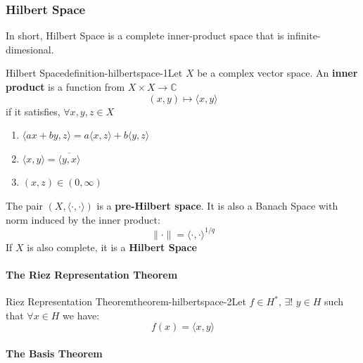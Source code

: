 \subsubsection{Hilbert Space}

In short, Hilbert Space is a complete inner-product space that is infinite-dimesional.

\begin{mystthmdefinition}{Hilbert Space}{definition-hilbertspace-1}Let $X$ be a complex vector space. An \textbf{inner product} is a function from $X \times X \to \mathbb{C}$
\begin{equation}
(x,y)\mapsto \langle x,y \rangle
\end{equation}
if it satisfies, $\forall x,y, z \in X$

\begin{enumerate}
\item $\langle ax+by, z\rangle=a\langle x,z \rangle + b\langle y, z\rangle$
\item $\langle x,y \rangle = \overline{\langle y, x\rangle}$
\item $(x,z)\in (0,\infty)$
\end{enumerate}

The pair $(X,\langle \cdot, \cdot\rangle)$ is a \textbf{pre-Hilbert space}. It is also a Banach Space with norm induced by the inner product:
\begin{equation}
\|\cdot \| = \langle\cdot, \cdot \rangle^{1/q}
\end{equation}
If $X$ is also complete, it is a \textbf{Hilbert Space}

\end{mystthmdefinition}
\paragraph{The Riez Representation Theorem}

\begin{mystthmtheorem}{Riez Representation Theorem}{theorem-hilbertspace-2}Let $f\in H^*$, $\exists !$ $y\in H$ such that $\forall x\in H$ we have:
\begin{equation}
f(x)=\langle x,y \rangle
\end{equation}

\end{mystthmtheorem}
\paragraph{The Basis Theorem}

